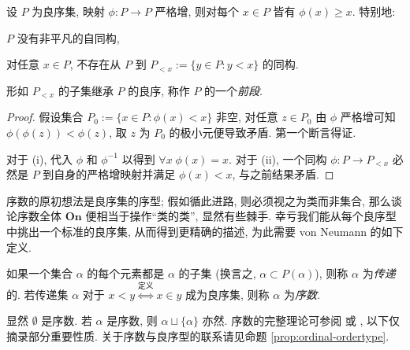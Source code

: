 \begin{lemma}\label{prop:wellorder-automorphism}
	设 $P$ 为良序集, 映射 $\phi: P \to P$ 严格增, 则对每个 $x \in P$ 皆有 $\phi(x) \geq x$. 特别地:
	\begin{inparaenum}[(i)]
		\item $P$ 没有非平凡的自同构,
		\item 对任意 $x \in P$, 不存在从 $P$ 到 $P_{< x} := \{y \in P : y < x \}$ 的同构.
	\end{inparaenum}
\end{lemma}
形如 $P_{< x}$ 的子集继承 $P$ 的良序, 称作 $P$ 的一个\emph{前段}.
\begin{proof}
	假设集合 $P_0 := \{x \in P : \phi(x) < x \}$ 非空, 对任意 $z \in P_0$ 由 $\phi$ 严格增可知 $\phi(\phi(z)) < \phi(z)$, 取 $z$ 为 $P_0$ 的极小元便导致矛盾. 第一个断言得证.

	对于 (i), 代入 $\phi$ 和 $\phi^{-1}$ 以得到 $\forall x \; \phi(x)=x$. 对于 (ii), 一个同构 $\phi: P \to P_{< x}$ 必然是 $P$ 到自身的严格增映射并满足 $\phi(x) < x$, 与之前结果矛盾.
\end{proof}

序数的原初想法是良序集的序型; 假如循此进路, 则必须视之为类而非集合, 那么谈论序数全体 $\textbf{On}$ 便相当于操作``类的类'', 显然有些棘手. 幸亏我们能从每个良序型中挑出一个标准的良序集, 从而得到更精确的描述, 为此需要 von Neumann 的如下定义.
\begin{definition}\label{def:ordinal}
	如果一个集合 $\alpha$ 的每个元素都是 $\alpha$ 的子集 (换言之, $\alpha \subset P(\alpha)$), 则称 $\alpha$ 为\emph{传递}的. 若传递集 $\alpha$ 对于 $x < y \stackrel{\text{定义}}{\iff} x \in y$ 成为良序集, 则称 $\alpha$ 为\emph{序数}.
\end{definition}

显然 $\emptyset$ 是序数. 若 $\alpha$ 是序数, 则 $\alpha \sqcup \{\alpha\}$ 亦然. 序数的完整理论可参阅 \cite[\S 2]{Je03} 或 \cite[第四章]{HY14}, 以下仅摘录部分重要性质. 关于序数与良序型的联系请见命题 \ref{prop:ordinal-ordertype}.

